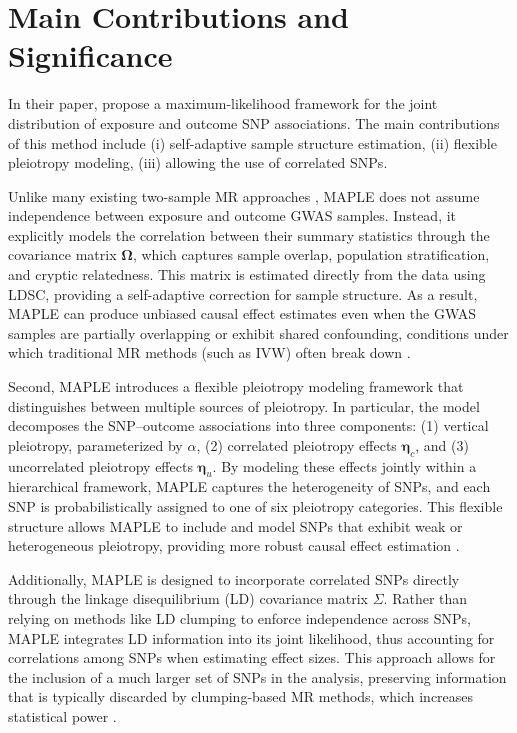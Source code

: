 \documentclass[12pt]{article}
\begin{document}
\section{Main Contributions and Significance}\label{sec:sig}
In their paper, \citet{Zhang2025} propose a maximum-likelihood framework for the joint distribution of exposure and outcome SNP associations. The main contributions of this method include (i) self-adaptive sample structure estimation, (ii) flexible pleiotropy modeling, (iii) allowing the use of correlated SNPs.

Unlike many existing two-sample MR approaches \citep{Zhang2025}, MAPLE does not assume independence between exposure and outcome GWAS samples. Instead, it explicitly models the correlation between their summary statistics through the covariance matrix $\boldsymbol\Omega$, which captures sample overlap, population stratification, and cryptic relatedness. This matrix is estimated directly from the data using LDSC, providing a self-adaptive correction for sample structure. As a result, MAPLE can produce unbiased causal effect estimates even when the GWAS samples are partially overlapping or exhibit shared confounding, conditions under which traditional MR methods (such as IVW) often break down \citep{Hu2022}. 

Second, MAPLE introduces a flexible pleiotropy modeling framework that distinguishes between multiple sources of pleiotropy. In particular, the model decomposes the SNP–outcome associations into three components: (1) vertical pleiotropy, parameterized by $\alpha$, (2) correlated pleiotropy effects $\boldsymbol \eta_c$, and (3) uncorrelated pleiotropy effects $\boldsymbol \eta_u$. By modeling these effects jointly within a hierarchical framework, MAPLE captures the heterogeneity of SNPs, and each SNP is probabilistically assigned to one of six pleiotropy categories. This flexible structure allows MAPLE to include and model SNPs that exhibit weak or heterogeneous pleiotropy, providing more robust causal effect estimation \citep{Zhang2025}.

Additionally, MAPLE is designed to incorporate correlated SNPs directly through the linkage disequilibrium (LD) covariance matrix $\Sigma$. Rather than relying on methods like LD clumping to enforce independence across SNPs, MAPLE integrates LD information into its joint likelihood, thus accounting for correlations among SNPs when estimating effect sizes. This approach allows for the inclusion of a much larger set of SNPs in the analysis, preserving information that is typically discarded by clumping-based MR methods, which increases statistical power \citep{Zhang2025}. 
\end{document}
